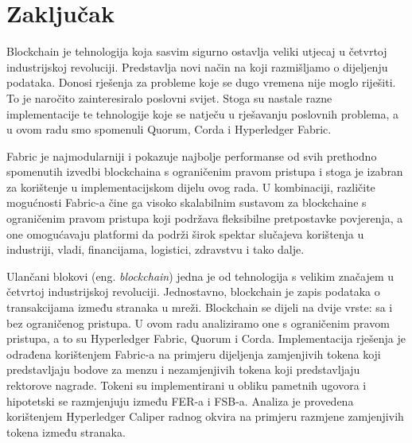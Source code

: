 \documentclass[times, utf8, diplomski]{fer}
\begin{document}
\chapter{Zaključak}
Blockchain je tehnologija koja sasvim sigurno ostavlja veliki utjecaj u četvrtoj industrijskoj revoluciji. Predstavlja novi način na koji razmišljamo o dijeljenju podataka. Donosi rješenja za probleme koje se dugo vremena nije moglo riješiti. To je naročito zainteresiralo poslovni svijet.  Stoga su nastale razne implementacije te tehnologije koje se natječu u rješavanju poslovnih problema, a u ovom radu smo spomenuli Quorum, Corda i Hyperledger Fabric.  

Fabric je najmodularniji i pokazuje najbolje performanse od svih prethodno spomenutih izvedbi blockchaina s ograničenim pravom pristupa i stoga je izabran za korištenje u implementacijskom dijelu ovog rada. U kombinaciji, različite mogućnosti Fabric-a čine ga visoko skalabilnim sustavom za blockchaine s ograničenim pravom pristupa koji podržava fleksibilne pretpostavke povjerenja, a one omogućavaju platformi da podrži širok spektar slučajeva korištenja u industriji, vladi, financijama, logistici, zdravstvu i tako dalje.





\begin{sazetak}
Ulančani blokovi (eng. \textit{blockchain}) jedna je od tehnologija s velikim značajem u četvrtoj industrijskoj revoluciji. Jednostavno, blockchain je zapis podataka o transakcijama između stranaka u mreži.  Blockchain se dijeli na dvije vrste: sa i bez ograničenog pristupa. U ovom radu analiziramo one s ograničenim pravom pristupa, a to su Hyperledger Fabric, Quorum i Corda. Implementacija rješenja je odrađena korištenjem Fabric-a na primjeru dijeljenja zamjenjivih tokena koji predstavljaju bodove za menzu i nezamjenjivih tokena koji predstavljaju rektorove nagrade. Tokeni su implementirani u obliku pametnih ugovora i hipotetski se razmjenjuju između FER-a i FSB-a.  Analiza je provedena korištenjem Hyperledger Caliper radnog okvira na primjeru razmjene zamjenjivih tokena između stranaka. 

\end{sazetak}
\end{document}
